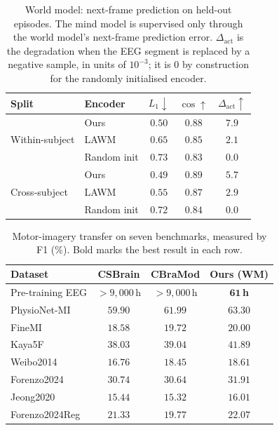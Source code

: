 
\begin{table}[t]
    \centering
    \caption{World model: next-frame prediction on held-out episodes. The mind model is
    supervised only through the world model's next-frame prediction error.
    $\Delta_\mathrm{act}$ is the degradation when the EEG segment is replaced by a
    negative sample, in units of $10^{-3}$; it is $0$ by construction for the
    randomly initialised encoder.}
    \label{tab:mwm_world}
    \begin{tabular}{llccc}
    \toprule
        Split & Encoder & $L_1\downarrow$ & $\cos\uparrow$ & $\Delta_\mathrm{act}\uparrow$ \\
    \midrule
        \multirow{3}{*}{Within-subject}
            & Ours        & $\mathbf{0.50}$ & $\mathbf{0.88}$ & $\mathbf{7.9}$ \\
            & LAWM        & $0.65$ & $0.85$ & $2.1$ \\
            & Random init & $0.73$ & $0.83$ & $0.0$ \\
    \midrule
        \multirow{3}{*}{Cross-subject}
            & Ours        & $\mathbf{0.49}$ & $\mathbf{0.89}$ & $\mathbf{5.7}$ \\
            & LAWM        & $0.55$ & $0.87$ & $2.9$ \\
            & Random init & $0.72$ & $0.84$ & $0.0$ \\
    \bottomrule
    \end{tabular}
\end{table}

\begin{table}[t]
    \centering
    \caption{Motor-imagery transfer on seven benchmarks, measured by F1 ($\%$).
    Bold marks the best result in each row.}
    \label{tab:mwm_motor_imagery}
    \begin{tabular}{lccc}
    \toprule
        Dataset & CSBrain & CBraMod & Ours (WM) \\
    \midrule
        Pre-training EEG & $>9{,}000$\,h & $>9{,}000$\,h & $\mathbf{61}$\,\textbf{h} \\
    \midrule
        PhysioNet-MI    & $59.90$ & $61.99$ & $\mathbf{63.30}$ \\
        FineMI          & $18.58$ & $19.72$ & $\mathbf{20.00}$ \\
        Kaya5F          & $38.03$ & $39.04$ & $\mathbf{41.89}$ \\
        Weibo2014       & $16.76$ & $18.45$ & $\mathbf{18.61}$ \\
        Forenzo2024     & $30.74$ & $30.64$ & $\mathbf{31.91}$ \\
        Jeong2020       & $15.44$ & $15.32$ & $\mathbf{16.01}$ \\
        Forenzo2024Reg  & $21.33$ & $19.77$ & $\mathbf{22.07}$ \\
    \bottomrule
    \end{tabular}
\end{table}
